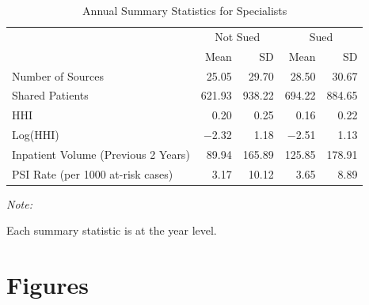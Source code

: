 \documentclass[
  12pt,
]{article}
\begin{document}
\FloatBarrier

\begin{table}

\caption{\label{tab:sumstats}Annual Summary Statistics for Specialists}
\centering
\fontsize{10}{12}\selectfont
\begin{threeparttable}
\begin{tabular}[t]{lrrrr}
\toprule
\multicolumn{1}{c}{ } & \multicolumn{2}{c}{Not Sued} & \multicolumn{2}{c}{Sued} \\
\cmidrule(l{3pt}r{3pt}){2-3} \cmidrule(l{3pt}r{3pt}){4-5}
  & Mean & SD & Mean & SD\\
\midrule
Number of Sources & \num{25.05} & \num{29.70} & \num{28.50} & \num{30.67}\\
Shared Patients & \num{621.93} & \num{938.22} & \num{694.22} & \num{884.65}\\
HHI & \num{0.20} & \num{0.25} & \num{0.16} & \num{0.22}\\
Log(HHI) & \num{-2.32} & \num{1.18} & \num{-2.51} & \num{1.13}\\
Inpatient Volume (Previous 2 Years) & \num{89.94} & \num{165.89} & \num{125.85} & \num{178.91}\\
PSI Rate (per 1000 at-risk cases) & \num{3.17} & \num{10.12} & \num{3.65} & \num{8.89}\\
\bottomrule
\end{tabular}
\begin{tablenotes}
\item \textit{Note: } 
\item Each summary statistic is at the year level.
\end{tablenotes}
\end{threeparttable}
\end{table}

\FloatBarrier

\newpage

\hypertarget{figures}{%
\section{Figures}\label{figures}}

\FloatBarrier
\end{document}
